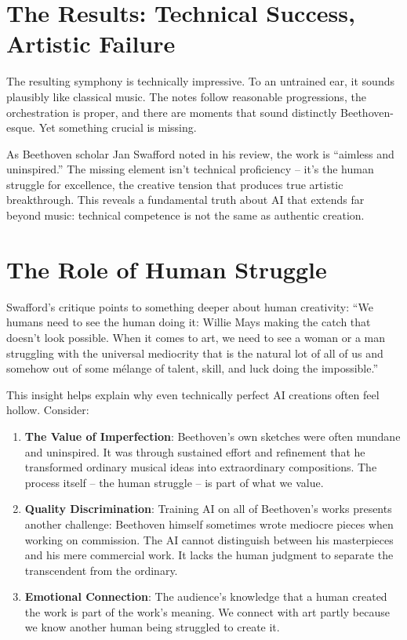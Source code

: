 \documentclass[
  Letterpaper,
]{scrbook}
\begin{document}
\section{The Results: Technical Success, Artistic
Failure}\label{the-results-technical-success-artistic-failure}

The resulting symphony is technically impressive. To an untrained ear,
it sounds plausibly like classical music. The notes follow reasonable
progressions, the orchestration is proper, and there are moments that
sound distinctly Beethoven-esque. Yet something crucial is missing.

As Beethoven scholar Jan Swafford noted in his review, the work is
``aimless and uninspired.'' The missing element isn't technical
proficiency -- it's the human struggle for excellence, the creative
tension that produces true artistic breakthrough. This reveals a
fundamental truth about AI that extends far beyond music: technical
competence is not the same as authentic creation.

\section{The Role of Human Struggle}\label{the-role-of-human-struggle}

Swafford's critique points to something deeper about human creativity:
``We humans need to see the human doing it: Willie Mays making the catch
that doesn't look possible. When it comes to art, we need to see a woman
or a man struggling with the universal mediocrity that is the natural
lot of all of us and somehow out of some mélange of talent, skill, and
luck doing the impossible.''

This insight helps explain why even technically perfect AI creations
often feel hollow. Consider:

\begin{enumerate}
\def\labelenumi{\arabic{enumi}.}
\item
  \textbf{The Value of Imperfection}: Beethoven's own sketches were
  often mundane and uninspired. It was through sustained effort and
  refinement that he transformed ordinary musical ideas into
  extraordinary compositions. The process itself -- the human struggle
  -- is part of what we value.
\item
  \textbf{Quality Discrimination}: Training AI on all of Beethoven's
  works presents another challenge: Beethoven himself sometimes wrote
  mediocre pieces when working on commission. The AI cannot distinguish
  between his masterpieces and his mere commercial work. It lacks the
  human judgment to separate the transcendent from the ordinary.
\item
  \textbf{Emotional Connection}: The audience's knowledge that a human
  created the work is part of the work's meaning. We connect with art
  partly because we know another human being struggled to create it.
\end{enumerate}
\end{document}
